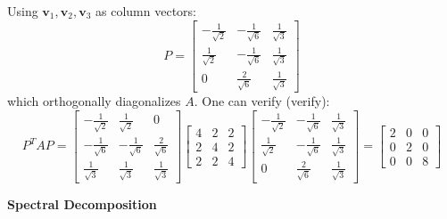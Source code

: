 \documentclass{article}
\newcommand{\redheading}[1]{{\vspace{2mm}\noindent\Large\bfseries\color{red!55!black} #1\par}\vspace{2mm}}
\theoremstyle{mystyle}
\begin{document}
Using $\mathbf{v}_1, \mathbf{v}_2, \mathbf{v}_3$ as column vectors:
\[
  P = \begin{bmatrix}
        -\tfrac{1}{\sqrt{2}} & -\tfrac{1}{\sqrt{6}} & \tfrac{1}{\sqrt{3}}\\[4pt]
        \tfrac{1}{\sqrt{2}}  & -\tfrac{1}{\sqrt{6}} & \tfrac{1}{\sqrt{3}}\\[4pt]
        0                   & \tfrac{2}{\sqrt{6}}  & \tfrac{1}{\sqrt{3}}
      \end{bmatrix}
\]
which orthogonally diagonalizes $A$. One can verify (verify):
\[
  P^T AP =
  \begin{bmatrix}-\tfrac{1}{\sqrt{2}}&\tfrac{1}{\sqrt{2}}&0\\[3pt]
                 -\tfrac{1}{\sqrt{6}}&-\tfrac{1}{\sqrt{6}}&\tfrac{2}{\sqrt{6}}\\[3pt]
                 \tfrac{1}{\sqrt{3}}&\tfrac{1}{\sqrt{3}}&\tfrac{1}{\sqrt{3}}\end{bmatrix}
  \begin{bmatrix}4&2&2\\2&4&2\\2&2&4\end{bmatrix}
  \begin{bmatrix}-\tfrac{1}{\sqrt{2}}&-\tfrac{1}{\sqrt{6}}&\tfrac{1}{\sqrt{3}}\\[3pt]
                 \tfrac{1}{\sqrt{2}}&-\tfrac{1}{\sqrt{6}}&\tfrac{1}{\sqrt{3}}\\[3pt]
                 0&\tfrac{2}{\sqrt{6}}&\tfrac{1}{\sqrt{3}}\end{bmatrix}
  = \begin{bmatrix}2&0&0\\0&2&0\\0&0&8\end{bmatrix}
\]

\redheading{Spectral Decomposition}
\end{document}

